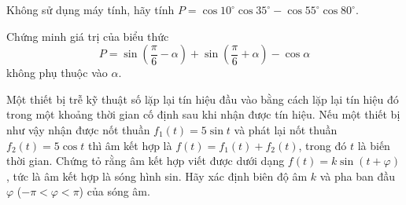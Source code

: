 \begin{vd}[VDT]%
	Không sử dụng máy tính, hãy tính $ P =\cos 10^{\circ}\cos35^{\circ} - \cos55^{\circ}\cos80^{\circ}.$
\end{vd}
\begin{vd}[VDT]%
	Chứng minh giá trị của biểu thức
	$$P = \sin \left(\dfrac{\pi}{6}-\alpha\right) + \sin \left(\dfrac{\pi}{6} + \alpha\right) -\cos \alpha$$
	không phụ thuộc vào $\alpha$.
\end{vd}
\begin{vd}%
	Một thiết bị trễ kỹ thuật số lặp lại tín hiệu đầu vào bằng cách lặp lại tín hiệu đó trong một khoảng thời gian cố định sau khi nhận được tín hiệu. Nếu một thiết bị như vậy nhận được nốt thuần $f_1(t) = 5\sin t$ và phát lại nốt thuần $f_2(t) = 5\cos t$ thì âm kết hợp là $f(t)=f_1(t)+f_2(t)$, trong đó $t$ là biến thời gian. Chứng tỏ rằng âm kết hợp viết được dưới dạng $f(t) = k\sin(t+\varphi)$, tức là âm kết hợp là sóng hình sin. Hãy xác định biên độ âm $k$ và pha ban đầu $\varphi$ ($-\pi < \varphi <\pi$) của sóng âm.
\end{vd}

